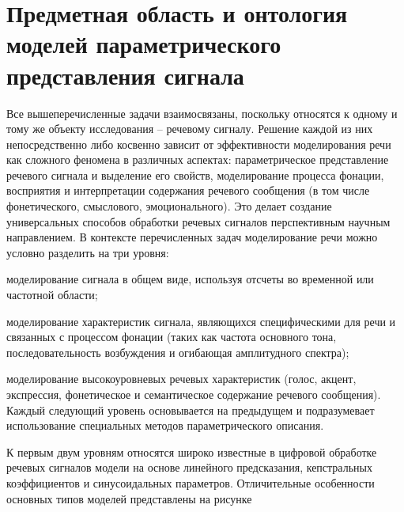 \section{Предметная область и онтология моделей параметрического представления сигнала}
\label{sec_audio_interfaces_subject_area_signal_models}

Все вышеперечисленные задачи взаимосвязаны, поскольку относятся к одному и тому же объекту исследования – речевому сигналу. Решение каждой из них непосредственно либо косвенно зависит от эффективности моделирования речи как сложного феномена в различных аспектах: параметрическое представление речевого сигнала и выделение его свойств, моделирование процесса фонации, восприятия и интерпретации содержания речевого сообщения (в том числе фонетического, смыслового, эмоционального). Это делает создание универсальных способов обработки речевых сигналов перспективным научным направлением.
В контексте перечисленных задач моделирование речи можно условно разделить на три уровня: 

\begin{textitemize}
    \item моделирование сигнала в общем виде, используя отсчеты во временной или частотной области; 
    \item моделирование характеристик сигнала, являющихся специфическими для речи и связанных с процессом фонации (таких как частота основного тона, последовательность возбуждения и огибающая амплитудного спектра); 
    \item моделирование высокоуровневых речевых характеристик (голос, акцент, экспрессия, фонетическое и семантическое содержание речевого сообщения).  Каждый следующий уровень основывается на предыдущем и подразумевает использование специальных методов параметрического описания.
\end{textitemize}

К первым двум уровням относятся широко известные в цифровой обработке речевых сигналов модели на основе линейного предсказания, кепстральных коэффициентов и синусоидальных параметров. Отличительные особенности основных типов моделей представлены на рисунке \textit{} 

